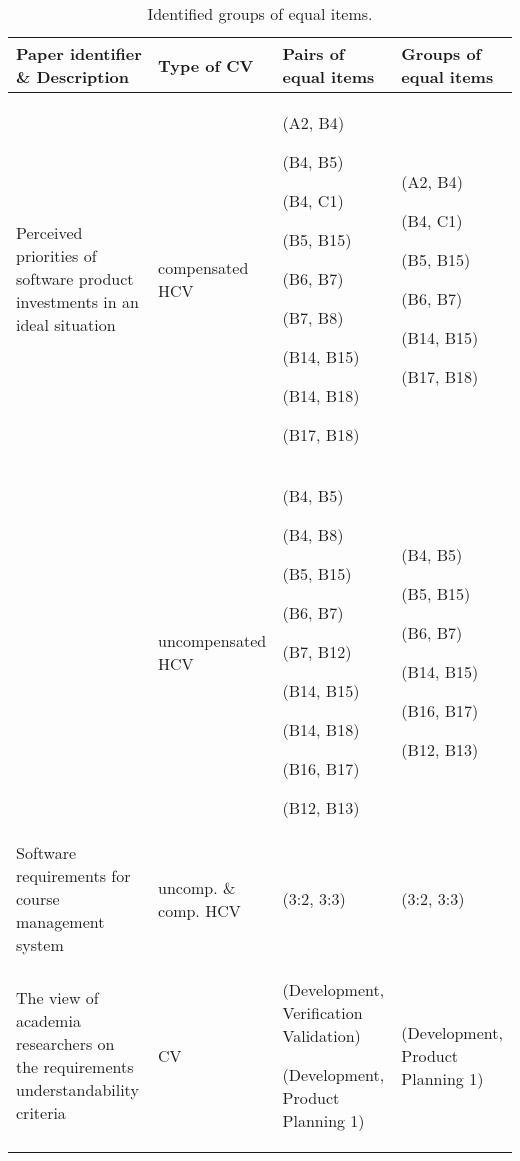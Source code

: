 \begin{table*}%
\caption{\label{tab:ECVresult}Identified groups of equal items.}

\begin{tabular}{|>{\centering}p{}|>{\centering}p{}|>{\centering}p{}|>{\centering}p{}|}
\hline 
Paper identifier \& Description  & Type of CV  & Pairs of equal items  & Groups of equal items\tabularnewline
\hline 
\citet{Barney2009} Perceived priorities of software product investments
in an ideal situation  & compensated HCV & (A2, B4)

(B4, B5)

(B4, C1)

(B5, B15)

(B6, B7)

(B7, B8)

(B14, B15)

(B14, B18)

(B17, B18) & (A2, B4)

(B4, C1)

(B5, B15)

(B6, B7)

(B14, B15)

(B17, B18)\tabularnewline
\cline{2-4}
 & uncompensated HCV & (B4, B5)

(B4, B8)

(B5, B15)

(B6, B7)

(B7, B12)

(B14, B15)

(B14, B18)

(B16, B17)

(B12, B13) & (B4, B5)

(B5, B15)

(B6, B7)

(B14, B15)

(B16, B17)

(B12, B13)\tabularnewline
\hline 
\citet{Berander2009a} Software requirements for course management system  & uncomp. \& comp. HCV  & (3:2, 3:3) & (3:2, 3:3)\tabularnewline
\hline 
\citet{Svahnberg2008} The view of academia researchers
on the requirements understandability criteria  & CV & (Development, Verification Validation)

(Development, Product Planning 1) & (Development, Product Planning 1)\tabularnewline
\hline
\end{tabular}%
\end{table*}


